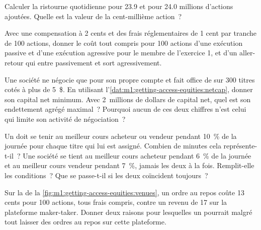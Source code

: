 \begin{exercise}[$\star$]\label{exo:m1:getting-access-equities:2}
Calculer la ristourne quotidienne pour 23.9 et pour 24.0 millions d'actions ajoutées. Quelle est la
valeur de la cent-millième action~?
\end{exercise}

\begin{exercise}[$\star$]\label{exo:m1:getting-access-equities:3}
Avec une compensation à 2 cents et des frais réglementaires de 1 cent par tranche de 100 actions, donner le
coût tout compris pour 100 actions d'une exécution passive et d'une exécution agressive
pour le membre de l'exercice 1, et d'un aller-retour qui entre passivement et
sort agressivement.
\end{exercise}

\begin{exercise}[$\star\star$]\label{exo:m1:getting-access-equities:4}
Une société ne négocie que pour son propre compte et fait office de  sur 300 titres
cotés à plus de 5~\$. En utilisant l'\cref{dat:m1:getting-access-equities:netcap}, donner son
capital net minimum. Avec 2~millions de dollars de capital net, quel est son
endettement agrégé maximal~? Pourquoi aucun de ces deux chiffres n'est celui qui limite son
activité de négociation~?
\end{exercise}

\begin{exercise}[$\star\star$]\label{exo:m1:getting-access-equities:5}
Un  doit se tenir au meilleur cours acheteur ou vendeur pendant 10~\% de la journée pour
chaque titre qui lui est assigné. Combien de minutes cela représente-t-il~? Une société se tient au meilleur
cours acheteur pendant 6~\% de la journée et au meilleur cours vendeur pendant 7~\%, jamais les deux à la fois. Remplit-elle
les conditions~? Que se passe-t-il si les deux coïncident toujours~?
\end{exercise}

\begin{exercise}[$\star\star$]\label{exo:m1:getting-access-equities:6}
Sur la  de la \cref{fig:m1:getting-access-equities:venues}, un
ordre au repos coûte 13 cents pour 100 actions, tous frais compris, contre
un revenu de 17 sur la plateforme maker-taker. Donner deux raisons pour lesquelles
un  pourrait malgré tout laisser des ordres au repos sur cette plateforme.
\end{exercise}

